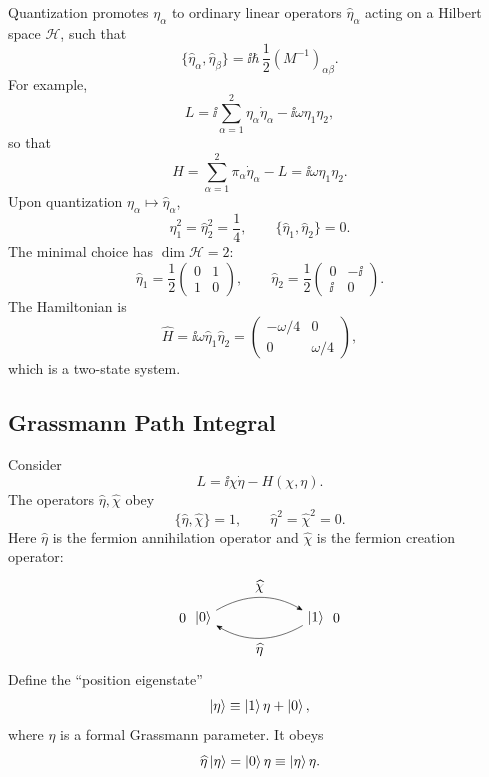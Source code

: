Quantization promotes \(\eta_\alpha\) to ordinary linear operators
\(\widehat\eta_\alpha\) acting on a Hilbert space \(\mathcal H\), such
that
\[
  \{\widehat\eta_\alpha,\widehat\eta_\beta\}
  =
  \ii\hbar\,\frac12(M^{-1})_{\alpha\beta}.
\]
For example,
\[
  L=
  \ii\sum_{\alpha=1}^2\eta_\alpha\dot\eta_\alpha
  -\ii\omega\eta_1\eta_2,
\]
so that
\[
  H
  =
  \sum_{\alpha=1}^2\pi_\alpha\dot\eta_\alpha-L
  =
  \ii\omega\eta_1\eta_2.
\]
Upon quantization \(\eta_\alpha\mapsto\widehat\eta_\alpha\),
\[
  \widehat\eta_1^2=\widehat\eta_2^2=\frac14,
  \qquad
  \{\widehat\eta_1,\widehat\eta_2\}=0.
\]
The minimal choice has \(\dim\mathcal H=2\):
\[
  \widehat\eta_1
  =
  \frac12
  \begin{pmatrix}
    0&1\\
    1&0
  \end{pmatrix},
  \qquad
  \widehat\eta_2
  =
  \frac12
  \begin{pmatrix}
    0&-\ii\\
    \ii&0
  \end{pmatrix}.
\]
The Hamiltonian is
\[
  \widehat H
  =
  \ii\omega\widehat\eta_1\widehat\eta_2
  =
  \begin{pmatrix}
    -\omega/4&0\\
    0&\omega/4
  \end{pmatrix},
\]
which is a two-state system.

\subsection{Grassmann Path Integral}

Consider
\[
  L=\ii\chi\dot\eta-H(\chi,\eta).
\]
The operators \(\widehat\eta,\widehat\chi\) obey
\[
  \{\widehat\eta,\widehat\chi\}=1,
  \qquad
  \widehat\eta^2=\widehat\chi^2=0.
\]
Here \(\widehat\eta\) is the fermion annihilation operator and
\(\widehat\chi\) is the fermion creation operator:
\[
\begin{tikzpicture}[baseline=(current bounding box.center),>=Stealth,scale=0.95]
  \node (zero) at (0,0) {\(\ket{0}\)};
  \node (one) at (3,0) {\(\ket{1}\)};
  \draw[->] (zero) to[bend left=30] node[above] {\(\widehat\chi\)} (one);
  \draw[->] (one) to[bend left=30] node[below] {\(\widehat\eta\)} (zero);
  \node at (-0.55,0) {\(0\)};
  \node at (3.55,0) {\(0\)};
\end{tikzpicture}
\]
Define the ``position eigenstate''
\[
  \ket{\eta}\equiv\ket{1}\eta+\ket{0},
\]
where \(\eta\) is a formal Grassmann parameter.  It obeys
\[
  \widehat\eta\ket{\eta}
  =
  \ket{0}\eta
  \equiv
  \ket{\eta}\eta.
\]

